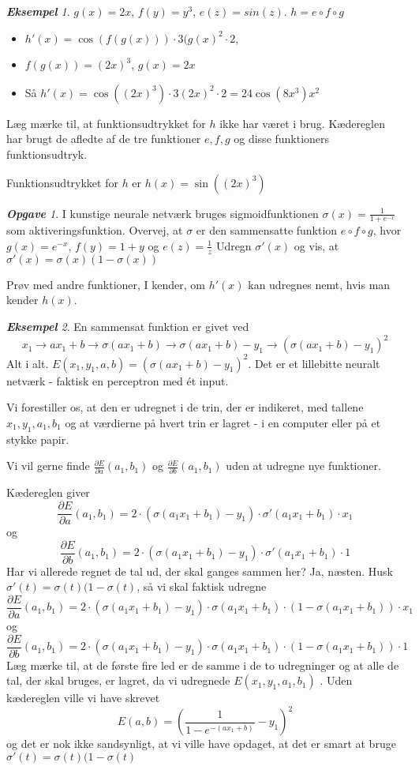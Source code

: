 \documentclass[a4paper, 12pt]{article}
\theoremstyle{remark}
\newtheorem{Eksempel}{\textbf{Eksempel}}
\newtheorem{Opgave}{\textbf{Opgave}}
\begin{document}
\begin{Eksempel} $g(x)=2x$, $f(y)=y^3$, $e(z)=sin(z)$. $h=e\circ f\circ g$

\begin{itemize}
\item $h'(x)=\cos(f(g(x)))\cdot 3(g(x)^2\cdot 2$, 
\item $f(g(x))=(2x)^3$, $g(x)=2x$
\item Så $h'(x)=\cos((2x)^3)\cdot 3(2x)^2\cdot 2=24\cos(8x^3)x^2$
\end{itemize}
Læg mærke til, at funktionsudtrykket for $h$ ikke har været i brug. Kædereglen har brugt de afledte af de tre funktioner $e,f,g$ og disse funktioners funktionsudtryk.

Funktionsudtrykket for $h$ er $h(x)=\sin((2x)^3)$

\end{Eksempel}
\begin{Opgave} I kunstige neurale netværk bruges sigmoidfunktionen $\sigma(x)=\frac{1}{1+e^{-x}}$ som aktiveringsfunktion.
Overvej, at $\sigma$ er den sammensatte funktion $e\circ f \circ g$, hvor $g(x)=e^{-x}$, $f(y)=1+y$ og $e(z)=\frac{1}{z}$
Udregn $\sigma'(x)$ og vis, at $\sigma'(x)=\sigma(x)(1-\sigma(x))$

Prøv med andre funktioner, I kender, om $h'(x)$ kan udregnes nemt, hvis man kender $h(x)$. 
\end{Opgave}
\begin{Eksempel}
En sammensat funktion er givet ved $$x_1 \to ax_1+b \to \sigma(ax_1+b) \to \sigma(ax_1+b)-y_1\to  (\sigma(ax_1+b)-y_1)^2$$
Alt i alt. $E(x_1,y_1,a,b)=(\sigma(ax_1+b)-y_1)^2$. Det er et lillebitte neuralt netværk - faktisk en perceptron med ét input. 

Vi forestiller os, at den er udregnet i de trin, der er indikeret, med tallene $x_1,y_1,a_1,b_1$  og at værdierne på hvert trin er lagret - i en computer eller på et stykke papir. 

Vi vil gerne finde $\frac{\partial E}{\partial a}(a_1,b_1)$ og  $\frac{\partial E}{\partial b}(a_1,b_1)$ uden at udregne nye funktioner.

Kædereglen giver $$\frac{\partial E}{\partial a}(a_1,b_1)=2\cdot (\sigma(a_1x_1+b_1)-y_1)\cdot \sigma'(a_1x_1+b_1)\cdot x_1$$ og $$\frac{\partial E}{\partial b}(a_1,b_1)=2\cdot (\sigma(a_1x_1+b_1)-y_1)\cdot \sigma'(a_1x_1+b_1)\cdot 1$$
Har vi allerede regnet de tal ud, der skal ganges sammen her? Ja, næsten. Husk $\sigma'(t)=\sigma(t)(1-\sigma(t)$, så vi skal faktisk udregne 
$$\frac{\partial E}{\partial a}(a_1,b_1)=2\cdot (\sigma(a_1x_1+b_1)-y_1)\cdot \sigma(a_1x_1+b_1)\cdot (1-\sigma(a_1x_1+b_1))\cdot x_1$$ og $$\frac{\partial E}{\partial b}(a_1,b_1)=2\cdot (\sigma(a_1x_1+b_1)-y_1)\cdot \sigma(a_1x_1+b_1)\cdot (1-\sigma(a_1x_1+b_1))\cdot 1$$
Læg mærke til, at de første fire led er de samme i de to udregninger og at alle de tal, der skal bruges, er lagret, da vi udregnede $E(x_1,y_1,a_1,b_1)$ . Uden kædereglen ville vi  have skrevet
$$E(a,b)=(\frac{1}{1-e^{-(ax_1+b)}}-y_1)^2$$ 
og det er nok ikke sandsynligt, at vi ville have opdaget, at det er smart at bruge $\sigma'(t)=\sigma(t)(1-\sigma(t)$


\end{Eksempel}
\end{document}
